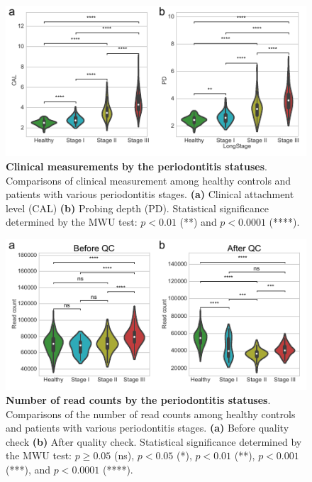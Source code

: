 \documentclass[11pt, a4paper, onecolumn, oneside]{report}
\begin{document}
            \begin{figure}[p]
                \centering
                \includegraphics[width=\linewidth]{Figures/Periodontitis/Figure_R02.pdf}
                \caption[Clinical measurements by the periodontitis statuses]{\textbf{Clinical measurements by the periodontitis statuses}. \\
                    Comparisons of clinical measurement among healthy controls and patients with various periodontitis stages. \textbf{(a)} Clinical attachment level (CAL) \textbf{(b)} Probing depth (PD). Statistical significance determined by the MWU test: $p < 0.01$ (**) and $p < 0.0001$ (****).}
                \label{fig:Periodontitis-clinical}
            \end{figure}
            \clearpage

            \begin{figure}[p]
                \centering
                \includegraphics[width=\linewidth]{Figures/Periodontitis/Figure_R03.pdf}
                \caption[Number of read counts by the periodontitis statuses]{\textbf{Number of read counts by the periodontitis statuses}. \\
                    Comparisons of the number of read counts among healthy controls and patients with various periodontitis stages. \textbf{(a)} Before quality check \textbf{(b)} After quality check. Statistical significance determined by the MWU test: $p \ge 0.05$ (ns), $p < 0.05$ (*), $p < 0.01$ (**), $p < 0.001$ (***), and $p < 0.0001$ (****).}
                \label{fig:Periodontitis-QC}
            \end{figure}
            \clearpage
\end{document}
